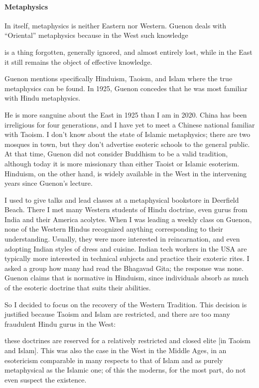 \paragraph{Metaphysics}
In itself, metaphysics is neither Eastern nor Western. Guenon deals with “Oriental” metaphysics because in the West such knowledge

\begin{quotex}
is a thing forgotten, generally ignored, and almost entirely lost, while in the East it still remains the object of effective knowledge. 

\end{quotex}
Guenon mentions specifically Hinduism, Taoism, and Islam where the true metaphysics can be found. In 1925, Guenon concedes that he was most familiar with Hindu metaphysics.

He is more sanguine about the East in 1925 than I am in 2020. China has been irreligious for four generations, and I have yet to meet a Chinese national familiar with Taoism. I don't know about the state of Islamic metaphysics; there are two mosques in town, but they don't advertise esoteric schools to the general public. At that time, Guenon did not consider Buddhism to be a valid tradition, although today it is more missionary than either Taoist or Islamic esoterism. Hinduism, on the other hand, is widely available in the West in the intervening years since Guenon's lecture.

I used to give talks and lead classes at a metaphysical bookstore in Deerfield Beach. There I met many Western students of Hindu doctrine, even gurus from India and their America acolytes. When I was leading a weekly class on Guenon, none of the Western Hindus recognized anything corresponding to their understanding. Usually, they were more interested in reincarnation, and even adopting Indian styles of dress and cuisine. Indian tech workers in the USA are typically more interested in technical subjects and practice their exoteric rites. I asked a group how many had read the Bhagavad Gita; the response was none. Guenon claims that is normative in Hinduism, since individuals absorb as much of the esoteric doctrine that suits their abilities.

So I decided to focus on the recovery of the Western Tradition. This decision is justified because Taoism and Islam are restricted, and there are too many fraudulent Hindu gurus in the West:

\begin{quotex}
these doctrines are reserved for a relatively restricted and closed elite [in Taoism and Islam]. This was also the case in the West in the Middle Ages, in an esotericism comparable in many respects to that of Islam and as purely metaphysical as the Islamic one; of this the moderns, for the most part, do not even suspect the existence. 

\end{quotex}
